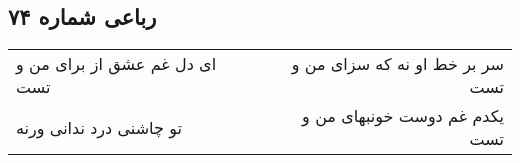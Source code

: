 \begin{center}
\section*{رباعی شماره ۷۴}
\label{sec:sh074}
\begin{longtable}{l p{0.5cm} r}
ای دل غم عشق از برای من و تست
&&
سر بر خط او نه که سزای من و تست
\\
تو چاشنی درد ندانی ورنه
&&
یکدم غم دوست خونبهای من و تست
\\
\end{longtable}
\end{center}
